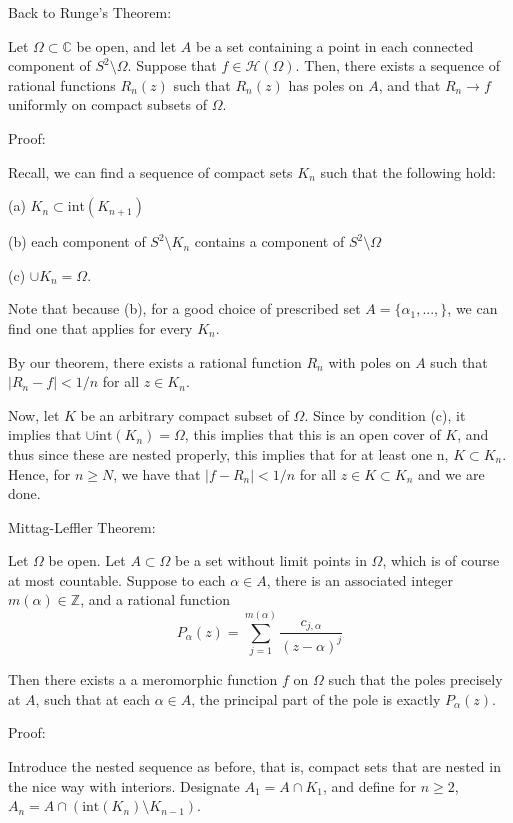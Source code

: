 \documentclass[10pt]{article}
\newcommand{\calH}{\mathcal{H}}
\begin{document}
Back to Runge’s Theorem:

Let $\Omega \subset \mathbb{C}$ be open, and let $A$ be a set containing a point in each connected component of $S^2 \setminus \Omega$. Suppose that $f \in \calH(\Omega)$. Then, there exists a sequence of rational functions $R_n(z)$ such that $R_n(z)$ has poles on $A$, and that $R_n \to f$ uniformly on compact subsets of $\Omega$. 

Proof:

Recall, we can find a sequence of compact sets $K_n$ such that the following hold:

(a) $K_n \subset \text{int}(K_{n+1})$

(b) each component of $S^2 \setminus K_n$ contains a component of $S^2 \setminus \Omega$

(c) $\cup K_n = \Omega$.

Note that because (b), for a good choice of prescribed set $A = \{ \alpha_1,...,\}$, we can find one that applies for every $K_n$. 

By our theorem, there exists a rational function $R_n$ with poles on $A$ such that $|R_n - f| < 1/n$ for all $z \in K_n$.

Now, let $K$ be an arbitrary compact subset of $\Omega$. Since by condition (c), it implies that $\cup \text{int}(K_n) = \Omega$, this implies that this is an open cover of $K$, and thus since these are nested properly, this implies that for at least one n, $K \subset K_n$. Hence, for $n \geq N$, we have that $| f - R_n | < 1/n$ for all $z \in K \subset K_n$ and we are done.

Mittag-Leffler Theorem:

Let $\Omega$ be open. Let $A \subset \Omega$ be a set without limit points in $\Omega$, which is of course at most countable. Suppose to each $\alpha \in A$, there is an associated integer $m(\alpha) \in \mathbb{Z}$, and a rational function 
$$P_\alpha(z) = \sum_{j=1}^{m(\alpha)} \frac{c_{j,\alpha}}{(z-\alpha)^j} $$

Then there exists a a meromorphic function $f$ on $\Omega$ such that the poles precisely at $A$, such that at each $\alpha \in A$, the principal part of the pole is exactly $P_\alpha(z)$.

Proof:

Introduce the nested sequence as before, that is, compact sets that are nested in the nice way with interiors. Designate $A_1 = A \cap K_1$, and define for $n \geq 2$, $A_n = A \cap (\text{int}(K_{n}) \setminus K_{n-1}) $.
\end{document}
